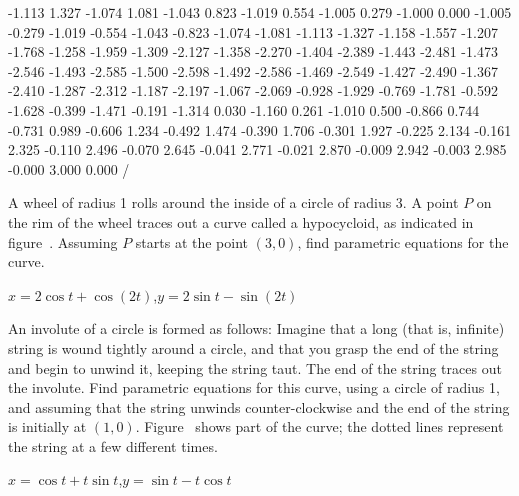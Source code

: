 \begin{exercises}
{-1.113 1.327 -1.074 1.081 -1.043 0.823 -1.019 0.554 -1.005 0.279
-1.000 0.000 -1.005 -0.279 -1.019 -0.554 -1.043 -0.823 -1.074 -1.081
-1.113 -1.327 -1.158 -1.557 -1.207 -1.768 -1.258 -1.959 -1.309 -2.127
-1.358 -2.270 -1.404 -2.389 -1.443 -2.481 -1.473 -2.546 -1.493 -2.585
-1.500 -2.598 -1.492 -2.586 -1.469 -2.549 -1.427 -2.490 -1.367 -2.410
-1.287 -2.312 -1.187 -2.197 -1.067 -2.069 -0.928 -1.929 -0.769 -1.781
-0.592 -1.628 -0.399 -1.471 -0.191 -1.314 0.030 -1.160 0.261 -1.010
0.500 -0.866 0.744 -0.731 0.989 -0.606 1.234 -0.492 1.474 -0.390
1.706 -0.301 1.927 -0.225 2.134 -0.161 2.325 -0.110 2.496 -0.070
2.645 -0.041 2.771 -0.021 2.870 -0.009 2.942 -0.003 2.985 -0.000
3.000 0.000 /
\textBlack
\endpicture}


\exercise A wheel of radius 1 rolls around the inside of 
a circle of radius 3. A point $P$ on the rim of the wheel traces out a
curve called a {\dfont hypocycloid}, as indicated in
figure~. Assuming $P$
starts at the point $(3,0)$, find parametric equations for the curve.
\begin{answer} $x=2\cos t+\cos(2t)$,\hfill\break $y=2\sin t-\sin(2t)$
\end{answer}
\label{exer:hypocycloid}

\exercise An {\dfont involute} of a circle is formed
as follows: Imagine that a long (that is, infinite) string is wound tightly
around a circle, and that you grasp the end of the string and begin to
unwind it, keeping the string taut. The end of the string traces out
the involute. Find parametric equations for this curve, using a circle
of radius 1, and assuming that the string unwinds counter-clockwise
and the end of the string is initially at $(1,0)$. 
Figure~ shows part of the curve; the
dotted lines represent the string at a few different times.
\begin{answer} $x=\cos t+t\sin t$,\hfill\break  $y=\sin t-t\cos t$
\end{answer}
\label{exer:involute of a circle}


\end{exercises}
